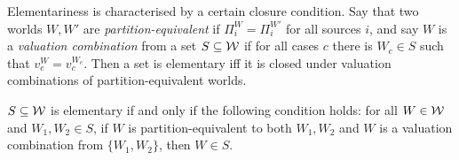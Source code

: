 
Elementariness is characterised by a certain closure condition. Say that two
worlds $W, W'$ are \emph{partition-equivalent} if $\Pi^W_i = \Pi^{W'}_i$ for
all sources $i$, and say $W$ is a \emph{valuation combination} from a set $S
\subseteq \mathcal{W}$ if for all cases $c$ there is $W_c \in S$ such that $v^W_c =
v^{W_c}_c$.  Then a set is elementary iff it is closed under valuation
combinations of partition-equivalent worlds.

\begin{proposition}
\label{prop:elementary_characterisation}
    $S \subseteq \mathcal{W}$ is elementary if and only if the following condition
    holds: for all $W \in \mathcal{W}$ and $W_1, W_2 \in S$, if $W$ is
    partition-equivalent to both $W_1, W_2$ and $W$ is a valuation combination
    from $\{W_1, W_2\}$, then $W \in S$.
\end{proposition}

